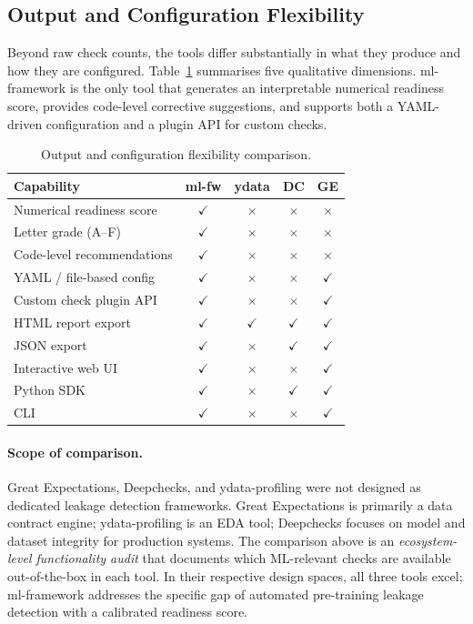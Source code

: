 \documentclass[12pt,a4paper]{report}
\newcommand{\tblhead}{\rowcolor{tblHeadBg}\color{white}\bfseries}
\newcommand{\cmark}{\ensuremath{\checkmark}}
\newcommand{\xmark}{\ensuremath{\times}}
\begin{document}
\subsection{Output and Configuration Flexibility}

Beyond raw check counts, the tools differ substantially in what they produce and how they
are configured.  Table~\ref{tab:flexibility} summarises five qualitative dimensions.
ml-framework is the only tool that generates an interpretable numerical readiness score,
provides code-level corrective suggestions, and supports both a YAML-driven configuration
and a plugin API for custom checks.

\begin{table}[!ht]
\centering
\caption{Output and configuration flexibility comparison.}
\label{tab:flexibility}
\scriptsize
{}
\begin{tabular}{lcccc}
\toprule
\tblhead \textbf{Capability} & \textbf{ml-fw} & \textbf{ydata} & \textbf{DC} & \textbf{GE} \\
\midrule
Numerical readiness score   & \cmark & \xmark & \xmark & \xmark \\
Letter grade (A--F)         & \cmark & \xmark & \xmark & \xmark \\
Code-level recommendations  & \cmark & \xmark & \xmark & \xmark \\
YAML / file-based config    & \cmark & \xmark & \xmark & \cmark \\
Custom check plugin API     & \cmark & \xmark & \xmark & \cmark \\
HTML report export          & \cmark & \cmark & \cmark & \cmark \\
JSON export                 & \cmark & \xmark & \cmark & \cmark \\
Interactive web UI          & \cmark & \xmark & \xmark & \cmark \\
Python SDK                  & \cmark & \xmark & \cmark & \cmark \\
CLI                         & \cmark & \xmark & \xmark & \cmark \\
\bottomrule
\end{tabular}
\end{table}

\paragraph{Scope of comparison.}
Great Expectations, Deepchecks, and ydata-profiling were not designed as dedicated
leakage detection frameworks.  Great Expectations is primarily a data contract engine;
ydata-profiling is an EDA tool; Deepchecks focuses on model and dataset integrity for
production systems.  The comparison above is an \emph{ecosystem-level functionality audit}
that documents which ML-relevant checks are available out-of-the-box in each tool.
In their respective design spaces, all three tools excel; ml-framework addresses the
specific gap of automated pre-training leakage detection with a calibrated readiness score.
\end{document}
